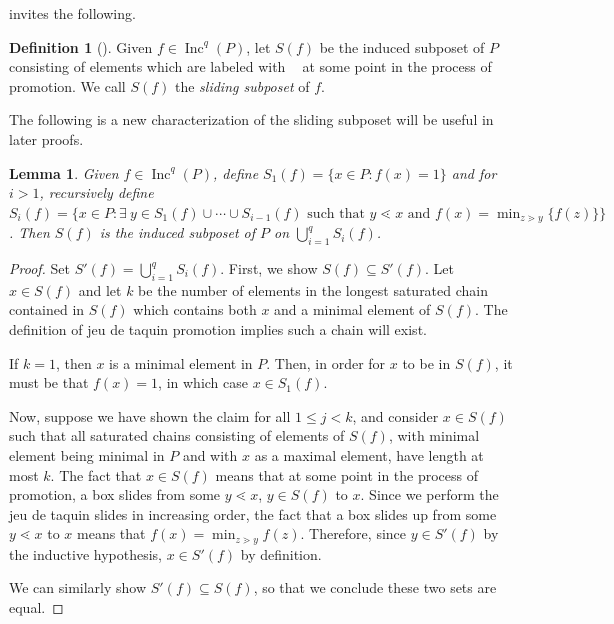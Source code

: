 \documentclass[11pt]{amsart}
\newtheorem{lemma}[theorem]{Lemma}
\theoremstyle{definition}
\newtheorem{definition}[theorem]{Definition}
\DeclareMathOperator{\boxempty}{\boxed{ }}
\DeclareMathOperator{\Inc}{\mathrm{Inc}}
\begin{document}
 invites the following.

\begin{definition}[]
\label{def:SlidingSubPoset}
Given $f \in \Inc^q(P)$, let $S(f)$ be the induced subposet of $P$ consisting of elements which are labeled with $\boxempty$ at some point in the process of promotion. We call $S(f)$ the \emph{sliding subposet} of $f$.
\end{definition}

 The following is a new characterization of the sliding subposet will be useful in later proofs. 

\begin{lemma}\label{lem:AlternateDescriptionSliding}
Given $f \in \Inc^q(P)$, define $S_1(f) = \{x \in P: f(x) = 1\}$ and for $i > 1$, recursively define $S_i(f) = \{x \in P: \exists~ y \in S_1(f) \cup \cdots \cup S_{i-1}(f) \text{ such that } y \lessdot x \text{ and } f(x) = \min_{z \gtrdot y}\{f(z)\}\}$. Then $S(f)$ is the induced subposet of $P$ on $\bigcup_{i=1}^q S_i(f)$.
\end{lemma}

\begin{proof}
Set $S'(f) = \bigcup_{i=1}^q S_i(f)$. First, we show $S(f) \subseteq S'(f)$. Let $x \in S(f)$ and let $k$ be the number of elements in the longest saturated chain contained in $S(f)$ which contains both $x$ and a minimal element of $S(f)$. The definition of jeu de taquin promotion implies such a chain will exist. 

If $k = 1$, then $x$ is a minimal element in $P$. Then, in order for $x$ to be in $S(f)$, it must be that $f(x) = 1$, in which case $x \in S_1(f)$.

Now, suppose we have shown the claim for all $1 \leq j < k$, and consider $x \in S(f)$ such that all saturated chains consisting of elements of $S(f)$, with minimal element being minimal in $P$ and with $x$ as a  maximal element, have length at most $k$. The fact that $x \in S(f)$ means that at some point in the process of promotion, a box slides from some $y \lessdot x$, $y \in S(f)$ to $x$. Since we perform the jeu de taquin slides in increasing order, the fact that a box slides up from some $y \lessdot x$ to $x$ means that $f(x) = \min_{z \gtrdot y} f(z)$. Therefore, since $y \in S'(f)$ by the inductive hypothesis, $x \in S'(f)$ by definition.  

We can similarly show $S'(f) \subseteq S(f)$, so that we conclude these two sets are equal. 
\end{proof}
\end{document}
